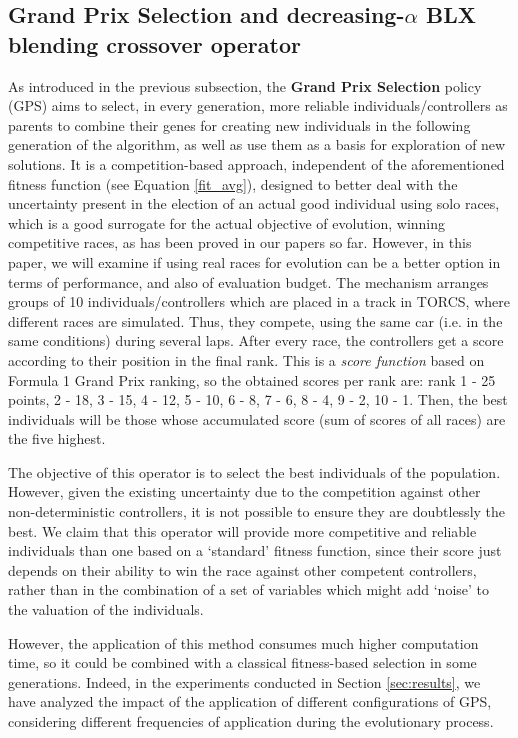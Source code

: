 \documentclass[10pt,journal,compsoc]{IEEEtran}
\begin{document}
\subsection{Grand Prix Selection and decreasing-$\alpha$ BLX blending crossover operator}
\label{subsec:novel_operators}
As introduced in the previous subsection, the \textbf{Grand Prix
Selection} policy (GPS) aims to select, in every generation, more
reliable individuals/controllers as parents to combine their genes for
creating new individuals in the following generation of the algorithm,
as well as use them as a basis for exploration of new solutions. It is
a competition-based approach, independent of the aforementioned
fitness function (see Equation \ref{fit_avg}), designed to better deal
with the uncertainty present in the election of an actual good
individual using solo races, which is a good surrogate for the actual
objective of evolution, winning competitive races, as has been proved
in our papers so far. However, in this paper, we will examine if using
real races for evolution can be a better option in terms of
performance, and also of evaluation budget.
The mechanism arranges groups of 10 individuals/controllers which are placed in a track in TORCS, where different races are simulated. Thus, they compete, using the same car (i.e. in the same conditions) during several laps. After every race, the controllers get a score according to their position in the final rank. This is a \textit{score function} based on Formula 1 Grand Prix ranking, so the obtained scores per rank are: rank 1 - 25 points, 2 - 18, 3 - 15, 4 - 12, 5 - 10, 6 - 8, 7 - 6, 8 - 4, 9 - 2, 10 - 1.
Then, the best individuals will be those whose accumulated score (sum of scores of all races) are the five highest.

The objective of this operator is to select the best
individuals of the population. However, given the existing uncertainty
\cite{DBLP:journals/tcci/MereloLFGCCRMGTCC16} due to the competition
against other non-deterministic controllers, it is not possible to
ensure they are doubtlessly the best. We claim that this operator will
provide more competitive and reliable individuals than one based on a
`standard' fitness function, since their score just depends on their
ability to win the race against other competent controllers, rather
than in the combination of a set of variables which might add `noise'
to the valuation of the individuals.

However, the application of this method consumes much higher computation time, so it could be combined with a classical fitness-based selection in some generations. Indeed, in the experiments conducted in Section \ref{sec:results}, we have analyzed the impact of the application of different configurations of GPS, considering different frequencies of application during the evolutionary process.
\end{document}
